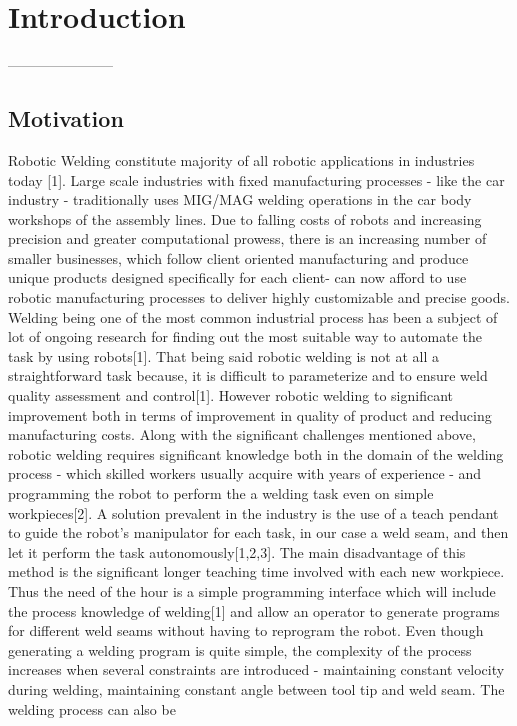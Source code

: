 \section{Introduction}
\localtableofcontents
-----------------------
\subsection{Motivation}
Robotic Welding constitute majority of all robotic applications in industries today [1]. Large scale
industries with fixed manufacturing processes - like the car industry - traditionally uses MIG/MAG
welding operations in the car body workshops of the assembly lines. Due to falling costs of
robots and increasing precision and greater computational prowess, there is an increasing
number of smaller businesses, which follow client oriented manufacturing and produce unique
products designed specifically for each client- can now afford to use robotic manufacturing
processes to deliver highly customizable and precise goods.
Welding being one of the most common industrial process has been a subject of lot of ongoing
research for finding out the most suitable way to automate the task by using robots[1]. That
being said robotic welding is not at all a straightforward task because, it is difficult to
parameterize and to ensure weld quality assessment and control[1]. However robotic welding to
significant improvement both in terms of improvement in quality of product and reducing
manufacturing costs.
Along with the significant challenges mentioned above, robotic welding requires significant
knowledge both in the domain of the welding process - which skilled workers usually acquire
with years of experience - and programming the robot to perform the a welding task even on
simple workpieces[2]. A solution prevalent in the industry is the use of a teach pendant to guide
the robot’s manipulator for each task, in our case a weld seam, and then let it perform the task
autonomously[1,2,3]. The main disadvantage of this method is the significant longer teaching
time involved with each new workpiece. Thus the need of the hour is a simple programming
interface which will include the process knowledge of welding[1] and allow an operator to
generate programs for different weld seams without having to reprogram the robot. Even
though generating a welding program is quite simple, the complexity of the process increases
when several constraints are introduced - maintaining constant velocity during welding,
maintaining constant angle between tool tip and weld seam. The welding process can also be
